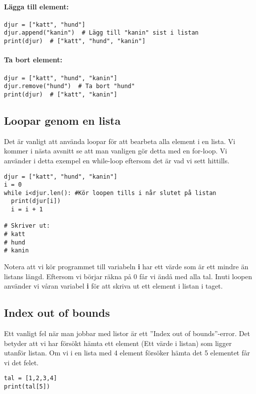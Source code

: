 \paragraph{Lägga till element:}
\begin{lstlisting}[title=Exempel: Lägga till element]
djur = ["katt", "hund"]
djur.append("kanin")  # Lägg till "kanin" sist i listan
print(djur)  # ["katt", "hund", "kanin"]
\end{lstlisting}

\paragraph{Ta bort element:}
\begin{lstlisting}[title=Exempel: Ta bort element]
djur = ["katt", "hund", "kanin"]
djur.remove("hund")  # Ta bort "hund"
print(djur)  # ["katt", "kanin"]
\end{lstlisting}

\subsection{Loopar genom en lista}
Det är vanligt att använda loopar för att bearbeta alla element i en lista.
Vi kommer i nästa avsnitt se att man vanligen gör detta med en for-loop. 
Vi använder i detta exempel en while-loop eftersom det är vad vi sett hittills. 
\begin{lstlisting}[title=Exempel: For-loop med en lista]
djur = ["katt", "hund", "kanin"]
i = 0
while i<djur.len(): #Kör loopen tills i når slutet på listan
  print(djur[i])
  i = i + 1

# Skriver ut:
# katt
# hund
# kanin
\end{lstlisting}

Notera att vi kör programmet till variabeln \textbf{i} har ett värde som är ett mindre än listans längd.
Eftersom vi börjar räkna på 0 får vi ändå med alla tal. 
Inuti loopen använder vi våran variabel \textbf{i} för att skriva ut
ett element i listan i taget. 


\subsection{Index out of bounds}
Ett vanligt fel när man jobbar med listor är ett ''Index out of bounds''-error.
Det betyder att vi har försökt hämta ett element (Ett värde i listan) som ligger utanför listan.
Om vi i en lista med 4 element försöker hämta det 5 elementet får vi det felet.
\begin{lstlisting}[title=Index out of bounds error]
tal = [1,2,3,4]
print(tal[5])
\end{lstlisting}

